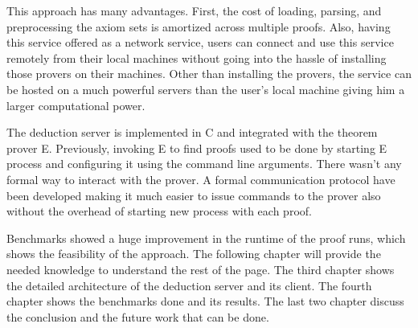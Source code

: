 This approach has many advantages. First, the cost of loading, parsing, and preprocessing the axiom sets is amortized across multiple proofs. Also, having this service offered as a network service, users can connect and use this service remotely from their local machines without going into the hassle of installing those provers on their machines. Other than installing the provers, the service can be hosted on a much powerful servers than the user's local machine giving him a larger computational power.

The deduction server is implemented in C and integrated with the theorem prover E\cite{Schulz:AICOM-2002,Schulz:LPAR-2013}. Previously, invoking E to find proofs used to be done by starting E process and configuring it using the command line arguments. There wasn't any formal way to interact with the prover. A formal communication protocol have been developed making it much easier to issue commands to the prover also without the overhead of starting new process with each proof.

Benchmarks showed a huge improvement in the runtime of the proof runs, which shows the feasibility of the approach. The following chapter will provide the needed knowledge to understand the rest of the page. The third chapter shows the detailed architecture of the deduction server and its client. The fourth chapter shows the benchmarks done and its results. The last two chapter discuss the conclusion and the future work that can be done.
